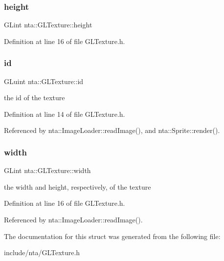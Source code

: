 \subsubsection{\texorpdfstring{height}{height}}
{\footnotesize\ttfamily G\+Lint nta\+::\+G\+L\+Texture\+::height}



Definition at line 16 of file G\+L\+Texture.\+h.

\mbox{\label{structnta_1_1GLTexture_aaf0d536088f4b1062d996679b217c0f9}} 
\subsubsection{\texorpdfstring{id}{id}}
{\footnotesize\ttfamily G\+Luint nta\+::\+G\+L\+Texture\+::id}



the id of the texture 



Definition at line 14 of file G\+L\+Texture.\+h.



Referenced by nta\+::\+Image\+Loader\+::read\+Image(), and nta\+::\+Sprite\+::render().

\mbox{\label{structnta_1_1GLTexture_a8f4d13ab2b19b700f76334c46458ac48}} 
\subsubsection{\texorpdfstring{width}{width}}
{\footnotesize\ttfamily G\+Lint nta\+::\+G\+L\+Texture\+::width}



the width and height, respectively, of the texture 



Definition at line 16 of file G\+L\+Texture.\+h.



Referenced by nta\+::\+Image\+Loader\+::read\+Image().



The documentation for this struct was generated from the following file\+:\begin{DoxyCompactItemize}
\item 
include/nta/G\+L\+Texture.\+h\end{DoxyCompactItemize}
